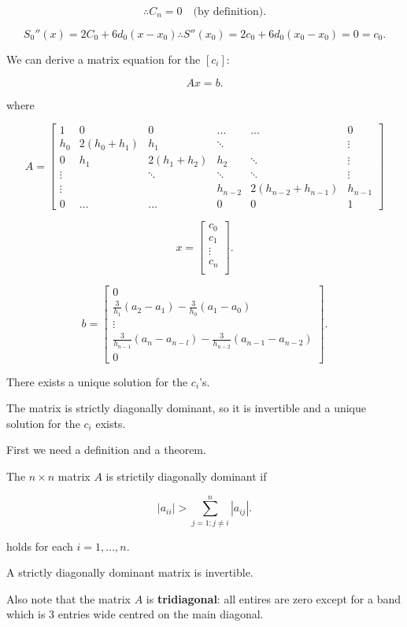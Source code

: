 \[
\therefore C_n = 0 \quad\text{(by definition)}
.\]

\[
S_0''(x) = 2C_0 + 6d_0(x-x_0) \therefore S''(x_0) = 2c_0 + 6d_0(x_0-x_0) = 0 =
c_0
.\]

We can derive a matrix equation for the $[c_i]$:

\[
Ax = b
.\]

where 

\[
  A = \begin{bmatrix}
    1 & 0 & 0 & \dots & \dots &  0 \\
    h_0 & 2(h_0+h_1) & h_1 & \ddots & &  \vdots\\
    0 & h_1 & 2(h_1+h_2) & h_2 & \ddots  & \vdots\\
    \vdots & & \ddots & \ddots & \ddots  & \vdots\\
    \vdots & & & h_{n-2} & 2(h_{n-2}+h_{n-1}) & h_{n-1}  \\
    0 & \dots & \dots & 0 & 0 & 1
  \end{bmatrix}
\]

\[
 x=\begin{bmatrix}
 c_0\\
 c_1\\
 \vdots\\
 c_n\\
 \end{bmatrix}
.\]

\[
b=\begin{bmatrix}
0\\
\frac{3}{h_1}(a_2-a_1)-\frac{3}{h_0}(a_1-a_0)\\
\vdots\\
\frac{3}{h_{n-1}}(a_{n}-a_{n-l})-\frac{3}{h_{n-2}}(a_{n-1}-a_{n-2})\\
0
\end{bmatrix}
.\]

There exists a unique solution for the $c_i$'s.

The matrix is strictly diagonally dominant, so it is invertible and a unique
solution for the $c_i$ exists.

First we need a definition and a theorem.

 The $n \times n$ matrix $A$ is strictily diagonally dominant if 

\[
  |a_{ii}| > \sum_{j=1; j\neq i}^{n} |a_{ij}|
.\]

holds for each $i = 1, \dots, n$.

\thm A strictly diagonally dominant matrix is invertible.

Also note that the matrix $A$ is \textbf{tridiagonal}: all entires are zero
except for a band which is 3 entries wide centred on the main diagonal.

